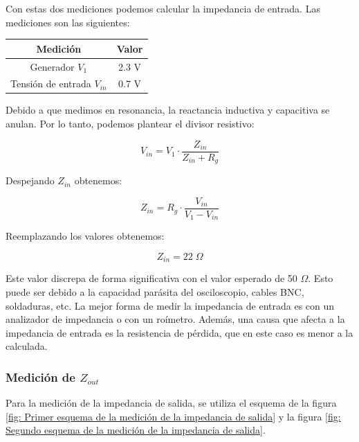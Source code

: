 Con estas dos mediciones podemos calcular la impedancia de entrada. Las mediciones son las siguientes:
\begin{table}[H]
    \centering
    \begin{tabular}{|c|c|}
    \hline
    \rowcolor[HTML]{C0C0C0} 
    \textbf{Medición} & \textbf{Valor} \\ \hline
    Generador $V_1$            & 2.3  V         \\ \hline
    Tensión de entrada $V_{in}$         & 0.7 V         \\ \hline
    \end{tabular}
\end{table}

Debido a que medimos en resonancia, la reactancia inductiva y capacitiva se anulan. Por lo tanto, podemos plantear el divisor resistivo:

\begin{equation}
    V_{in} = V_1 \cdot \frac{Z_{in}}{Z_{in} + R_{g}}
\end{equation}

Despejando $Z_{in}$ obtenemos:

\begin{equation}
    Z_{in} = R_g \cdot \frac{ V_{in}}{V_1 - V_{in}}
\end{equation}

Reemplazando los valores obtenemos:

\begin{equation}
    \boxed{Z_{in} = 22\; \Omega}
\end{equation}

Este valor discrepa de forma significativa con el valor esperado de 50 $\Omega$. Esto puede ser debido a la capacidad parásita del osciloscopio, cables BNC, soldaduras, etc. 
La mejor forma de medir la impedancia de entrada es con un analizador de impedancia o con un roímetro. 
Además, una causa que afecta a la impedancia de entrada es la resistencia de pérdida, que en este caso es menor a la calculada.

\subsubsection{Medición de $Z_{out}$}

Para la medición de la impedancia de salida, se utiliza el esquema de la figura \ref{fig: Primer esquema de la medición de la impedancia de salida} y la figura
\ref{fig: Segundo esquema de la medición de la impedancia de salida}.

